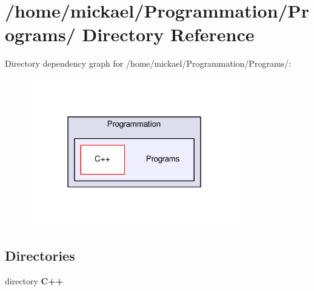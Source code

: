 \section{/home/mickael/\-Programmation/\-Programs/ Directory Reference}
\label{dir_63622f1541152e89d291cb5cdf8be1cc}
Directory dependency graph for /home/mickael/\-Programmation/\-Programs/\-:\nopagebreak
\begin{figure}[H]
\begin{center}
\leavevmode
\includegraphics[width=260pt]{dir_63622f1541152e89d291cb5cdf8be1cc_dep}
\end{center}
\end{figure}
\subsection*{Directories}
\begin{DoxyCompactItemize}
\item 
directory {\bf C++}
\end{DoxyCompactItemize}
